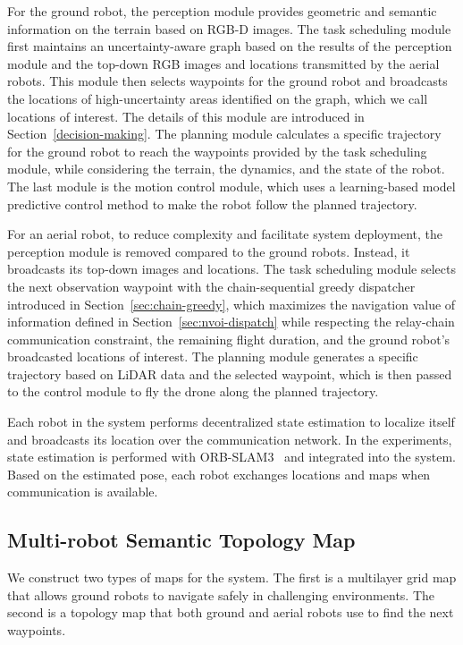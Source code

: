 For the ground robot, the perception module provides geometric and semantic information on the terrain based on RGB-D images. The task scheduling module first maintains an uncertainty-aware graph based on the results of the perception module and the top-down RGB images and locations transmitted by the aerial robots. This module then selects waypoints for the ground robot and broadcasts the locations of high-uncertainty areas identified on the graph, which we call locations of interest. The details of this module are introduced in Section~\ref{decision-making}. The planning module calculates a specific trajectory for the ground robot to reach the waypoints provided by the task scheduling module, while considering the terrain, the dynamics, and the state of the robot. The last module is the motion control module, which uses a learning-based model predictive control method to make the robot follow the planned trajectory.

For an aerial robot, to reduce complexity and facilitate system deployment, the perception module is removed compared to the ground robots. Instead, it broadcasts its top-down images and locations. The task scheduling module selects the next observation waypoint with the chain-sequential greedy dispatcher introduced in Section~\ref{sec:chain-greedy}, which maximizes the navigation value of information defined in Section~\ref{sec:nvoi-dispatch} while respecting the relay-chain communication constraint, the remaining flight duration, and the ground robot's broadcasted locations of interest. The planning module generates a specific trajectory based on LiDAR data and the selected waypoint, which is then passed to the control module to fly the drone along the planned trajectory.

Each robot in the system performs decentralized state estimation to localize itself and broadcasts its location over the communication network. In the experiments, state estimation is performed with ORB-SLAM3~\cite{campos2021orb} and integrated into the system. Based on the estimated pose, each robot exchanges locations and maps when communication is available.

\subsection{Multi-robot Semantic Topology Map}
\label{mrsm}

We construct two types of maps for the system. The first is a multilayer grid map that allows ground robots to navigate safely in challenging environments. The second is a topology map that both ground and aerial robots use to find the next waypoints.

